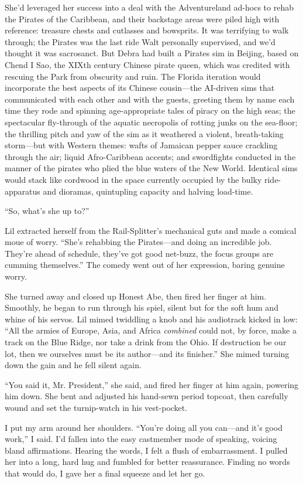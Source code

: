 She'd leveraged her success into a deal with the Adventureland
ad-hocs to rehab the Pirates of the Caribbean, and their backstage
areas were piled high with reference: treasure chests and cutlasses
and bowsprits. It was terrifying to walk through; the Pirates was
the last ride Walt personally supervised, and we'd thought it was
sacrosanct. But Debra had built a Pirates sim in Beijing, based on
Chend I Sao, the XIXth century Chinese pirate queen, which was
credited with rescuing the Park from obscurity and ruin. The
Florida iteration would incorporate the best aspects of its Chinese
cousin—the AI-driven sims that communicated with each other and
with the guests, greeting them by name each time they rode and
spinning age-appropriate tales of piracy on the high seas; the
spectacular fly-through of the aquatic necropolis of rotting junks
on the sea-floor; the thrilling pitch and yaw of the sim as it
weathered a violent, breath-taking storm—but with Western themes:
wafts of Jamaican pepper sauce crackling through the air; liquid
Afro-Caribbean accents; and swordfights conducted in the manner of
the pirates who plied the blue waters of the New World. Identical
sims would stack like cordwood in the space currently occupied by
the bulky ride-apparatus and dioramas, quintupling capacity and
halving load-time.

“So, what's she up to?”

Lil extracted herself from the Rail-Splitter's mechanical guts and
made a comical moue of worry. “She's rehabbing the Pirates—and
doing an incredible job. They're ahead of schedule, they've got
good net-buzz, the focus groups are cumming themselves.” The comedy
went out of her expression, baring genuine worry.

She turned away and closed up Honest Abe, then fired her finger at
him. Smoothly, he began to run through his spiel, silent but for
the soft hum and whine of his servos. Lil mimed twiddling a knob
and his audiotrack kicked in low: “All the armies of Europe, Asia,
and Africa \emph{combined} could not, by force, make a track on the
Blue Ridge, nor take a drink from the Ohio. If destruction be our
lot, then we ourselves must be its author—and its finisher.” She
mimed turning down the gain and he fell silent again.

“You said it, Mr. President,” she said, and fired her finger at him
again, powering him down. She bent and adjusted his hand-sewn
period topcoat, then carefully wound and set the turnip-watch in
his vest-pocket.

I put my arm around her shoulders. “You're doing all you can—and
it's good work,” I said. I'd fallen into the easy castmember mode
of speaking, voicing bland affirmations. Hearing the words, I felt
a flush of embarrassment. I pulled her into a long, hard hug and
fumbled for better reassurance. Finding no words that would do, I
gave her a final squeeze and let her go.

